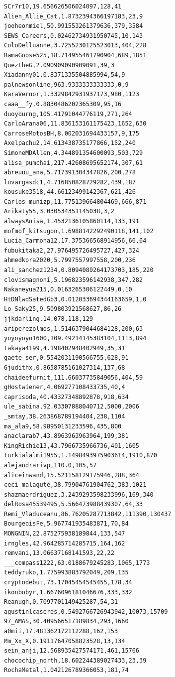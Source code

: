 \begin{verbatim}
SCr7r10,19.656626506024097,128,41
Alien_Allie_Cat,1.8732394366197183,23,9
jooheonmiel,50.991553261379636,379,3584
SEWS_Careers,0.02462734931950745,10,143
ColoDelluanne,3.7255230125523013,404,228
BamaGoose525,18.714955461790904,689,1851
QueztheG,2.090909090909091,39,3
Xiadanny01,0.8371335504885994,54,9
palnewsonline,963.9333333333333,0,9
KaraVernor,1.3329842931937173,980,1123
caaa__fy,0.8830486202365309,95,16
duoyourng,105.41791044776119,271,264
CarloArana06,11.836153161175423,1652,630
CarroseMotosBH,8.002031694433157,9,175
Axelpachu2,14.613438735177866,152,240
SimoneMDAllen,4.344891354600093,503,729
alisa_pumchai,217.42608695652174,307,61
abreuuu_ana,5.717391304347826,200,278
luvargasdc1,4.716850828729282,439,187
kousuke3518,44.66123499142367,621,426
Carlos_munizp,11.775139664804469,666,871
Arikaty55,3.030534351145038,3,2
alwaysAnisa,1.4532136105860114,133,191
mofmof_kitsugon,1.6988142292490118,141,102
Lucia_Carmona12,17.375366568914956,66,64
fubukitaka2,27.976495726495727,427,324
ahmedkora2020,5.7997557997558,200,236
ali_sanchez1234,0.8094089264173703,185,220
clovismagnoni,5.196823596142938,347,282
Nakaneyua215,0.0163265306122449,0,10
HtDNlwdSatedGb3,0.012033694344163659,1,0
Lo_Saky25,9.509803921568627,86,26
jjkdarling,14.078,118,129
ariperezolmos,1.5146379044684128,200,63
yoyoyoyo1600,109.49214145383104,1113,894
takaya4199,4.198402948402949,35,31
gaete_ser,0.5542031190566755,628,91
6judithx,0.8658785161027314,137,68
chaideefurnit,111.66037735849056,404,59
gHostwiener,4.069277108433735,40,4
caprisoda,40.43327348892878,918,634
ule_sabina,92.03307888040712,5000,2006
_smtay,38.263868789194404,238,1104
ma_ala9,58.98950131233596,435,800
anaclarab7,43.8963963963964,199,381
KingRichie13,43.7966735966736,401,1605
turkialalmi1955,1.1498493975903614,1910,870
alejandrarivp,110.0,105,57
aliceinwand,15.521158129175946,288,364
ceci_malagute,38.79904761904762,383,1021
shazmaerdriguez,3.2439293598233996,169,340
delRosa45539495,5.566473988439307,64,33
Remi_Vladuceanu,86.76205287713842,111390,130437
BourgeoisFe,5.967741935483871,70,84
MONGNIN,22.875275938189844,133,547
irngles,42.964285714285715,164,162
remvani,13.06637168141593,22,22
___compass1222,63.0188679245283,1065,1773
teddyruko,1.775993883792049,209,135
cryptodebut,73.17045454545455,178,34
ikonbobyr,1.6676096181046676,333,332
Reanugh,0.7097701149425287,54,31
agustinlcaseres,0.5492766726943942,10073,15709
97_AMAS,30.409566517189834,293,1660
a0mii,17.481362172112288,162,153
Mm_Xx_X,0.19117647058823528,13,134
sein_anji,12.568935427574171,461,15766
chocochip_north,18.602244389027433,23,39
RochaMetal,1.042126789366053,181,74

\end{verbatim}
